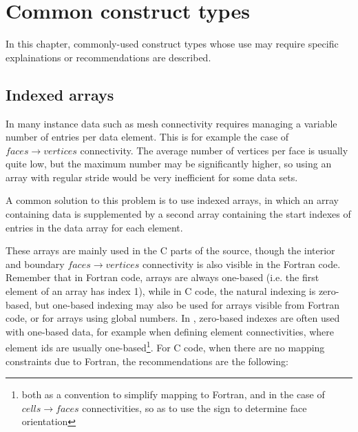 
%
%
%
%


\section{Common construct types}

In this chapter, commonly-used construct types whose use may require specific
explainations or recommendations are described.

\subsection{Indexed arrays}

In many instance data such as mesh connectivity requires managing a variable
number of entries per data element. This is for example the case of
$faces \rightarrow vertices$ connectivity. The average number of vertices
per face is usually quite low, but the maximum number may be significantly
higher, so using an array with regular stride would be very inefficient
for some data sets.

A common solution to this problem is to use indexed arrays, in which an array
containing data is supplemented by a second array containing the start indexes
of entries in the data array for each element.

These arrays are mainly used in the C parts of the \CS source, though
the interior and boundary $faces \rightarrow vertices$ connectivity is also
visible in the Fortran code. Remember that in Fortran code, arrays
are always one-based (i.e. the first element of an array has index 1),
while in C code, the natural indexing is zero-based, but one-based
indexing may also be used for arrays visible from Fortran code, or for arrays
using global numbers. In \CS, zero-based indexes are often used with
one-based data, for example when defining element connectivities,
where element ids are usually one-based\footnote{both as a convention
to simplify mapping to Fortran, and in the case of $cells \rightarrow faces$
connectivities, so as to use the sign to determine face orientation}.
For C code, when there are no mapping constraints due to Fortran,
the recommendations are the following:

